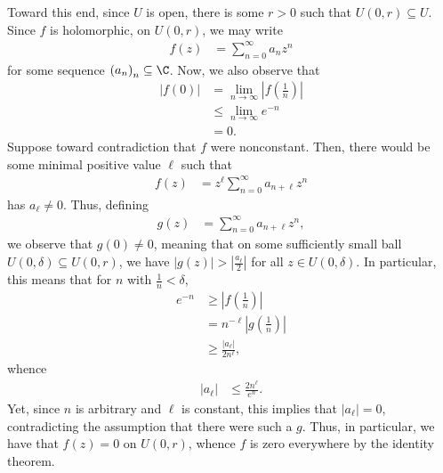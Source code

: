 \documentclass[10pt]{mypackage}
\begin{document}
\begin{example}
  Toward this end, since $U$ is open, there is some $r > 0$ such that $U\left( 0,r \right)\subseteq U$. Since $f$ is holomorphic, on $U\left( 0,r \right)$, we may write
  \begin{align*}
    f\left( z \right) &= \sum_{n=0}^{\infty}a_nz^{n}
  \end{align*}
  for some sequence $\left( a_n \right)_n\subseteq \C$. Now, we also observe that
  \begin{align*}
    \left\vert f(0) \right\vert &= \lim_{n\rightarrow\infty} \left\vert f\left( \frac{1}{n} \right) \right\vert\\
                                &\leq \lim_{n\rightarrow\infty} e^{-n}\\
                                &= 0.
  \end{align*}
  Suppose toward contradiction that $f$ were nonconstant. Then, there would be some minimal positive value $\ell$ such that
  \begin{align*}
    f(z) &= z^{\ell}\sum_{n=0}^{\infty}a_{n + \ell}z^{n}
  \end{align*}
  has $a_{\ell}\neq 0$. Thus, defining
  \begin{align*}
    g(z) &= \sum_{n=0}^{\infty}a_{n + \ell}z^{n},
  \end{align*}
  we observe that $g\left( 0 \right) \neq 0$, meaning that on some sufficiently small ball $U\left( 0,\delta \right)\subseteq U\left( 0,r \right)$, we have $\left\vert g(z) \right\vert > \left\vert \frac{a_{\ell}}{2} \right\vert$ for all $z\in U\left( 0,\delta \right)$. In particular, this means that for $n$ with $\frac{1}{n} < \delta$,
  \begin{align*}
    e^{-n} &\geq \left\vert f\left( \frac{1}{n} \right) \right\vert\\
           &= n^{-\ell}\left\vert g\left( \frac{1}{n} \right) \right\vert\\
           &\geq \frac{\left\vert a_{\ell} \right\vert}{2n^{\ell}},
  \end{align*}
  whence
  \begin{align*}
    \left\vert a_{\ell} \right\vert &\leq \frac{2n^{\ell}}{e^{n}}.
  \end{align*}
  Yet, since $n$ is arbitrary and $\ell$ is constant, this implies that $\left\vert a_{\ell} \right\vert = 0$, contradicting the assumption that there were such a $g$. Thus, in particular, we have that $f(z) = 0$ on $U\left( 0,r \right)$, whence $f$ is zero everywhere by the identity theorem.
\end{example}
\end{document}
